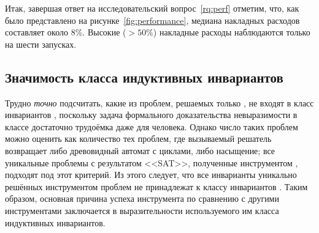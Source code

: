 Итак, завершая ответ на исследовательский вопрос~\ref{rq:perf} отметим, что, как было представлено на рисунке~\ref{fig:performance}, медиана накладных расходов \theringenCICI{} составляет около 8\%. Высокие ($>50\%$) накладные расходы наблюдаются только на шести запусках.

\subsection{Значимость класса индуктивных инвариантов}

Трудно \emph{точно} подсчитать, какие из проблем, решаемых только \theringenCICI{}, не входят в класс инвариантов \elemclass{}, поскольку задача формального доказательства невыразимости в классе \elemclass{} достаточно трудоёмка даже для человека. Однако число таких проблем можно оценить как количество тех проблем, где вызываемый решатель возвращает либо древовидный автомат с циклами, либо насыщение; все уникальные проблемы с результатом <<SAT>>, полученные инструментом \theringenCICI{}, подходят под этот критерий. Из этого следует, что все инварианты уникально решённых инструментом \theringenCICI{} проблем не принадлежат к классу инвариантов \elemclass{}. Таким образом, основная причина успеха инструмента \theringenCICI{} по сравнению с другими инструментами заключается в выразительности используемого им класса индуктивных инвариантов.

